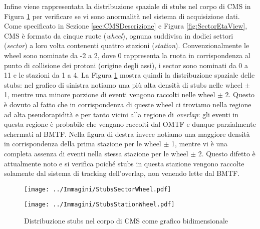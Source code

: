 Infine viene rappresentata la distribuzione spaziale di stubs nel corpo di CMS in Figura \ref{fig:StubsInCMS} per verificare se vi sono anormalità nel sistema di acquisizione dati. Come specificato in Sezione \ref{sec:CMSDescrizione} e Figura \ref{fig:SectorEtaView}, CMS è formato da cinque ruote (\textit{wheel}), ognuna suddivisa in dodici settori (\textit{sector}) a loro volta contenenti quattro stazioni (\textit{station}). Convenzionalmente le wheel sono nominate da -2 a 2, dove 0 rappresenta la ruota in corrispondenza al punto di collisione dei protoni (origine degli assi), i sector sono nominati da 0 a 11 e le stazioni da 1 a 4. La Figura \ref{fig:StubsInCMS} mostra quindi la distribuzione spaziale delle stubs: nel grafico di sinistra notiamo una più alta densità di stubs nelle wheel $\pm$ 1, mentre una minore porzione di eventi vengono raccolti nelle wheel $\pm$ 2. Questo è dovuto al fatto che in corrispondenza di queste wheel ci troviamo nella regione ad alta pseudorapidità e per tanto vicini alla regione di \textit{overlap}: gli eventi in questa regione è probabile che vengano raccolti dal OMTF e dunque parzialmente schermati al BMTF. Nella figura di destra invece notiamo una maggiore densità in corrispondenza della prima stazione per le wheel $\pm$ 1, mentre vi è una completa assenza di eventi nella stessa stazione per le wheel $\pm$ 2. Questo difetto è attualmente noto e si verifica poiché stubs in questa stazione vengono raccolte solamente dal sistema di tracking dell'overlap, non venendo lette dal BMTF.




  \begin{figure}[t]
    \centering
    \begin{minipage}[b]{0.49\textwidth}
        \centering
        \texttt{[image: ../Immagini/StubsSectorWheel.pdf]} 
      \end{minipage}
      \hfill 
      \begin{minipage}[b]{0.49\textwidth}
        \centering
        \texttt{[image: ../Immagini/StubsStationWheel.pdf]} 
      \end{minipage}
      \caption{Distribuzione stubs nel corpo di CMS come grafico bidimensionale}
    \label{fig:StubsInCMS}
  \end{figure}





